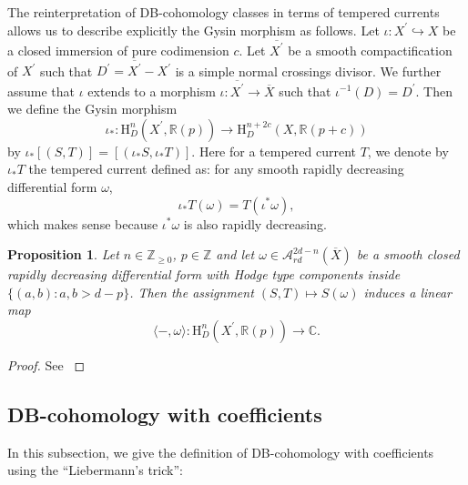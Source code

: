 \documentclass[11pt, a4paper]{amsart}
\theoremstyle{plain}
\newtheorem{proposition}[theorem]{Proposition}
\theoremstyle{definition}
\numberwithin{equation}{section}
\def\CC{\mathbb{C}}
\def\RR{\mathbb{R}}
\def\ZZ{\mathbb{Z}}
\begin{document}
The reinterpretation of DB-cohomology classes in terms of tempered currents allows us to describe explicitly the Gysin morphism as follows. 
Let $\iota \colon X^{\prime} \hookrightarrow X$ be a closed immersion of pure codimension $c$. Let $\overline{X^{\prime}}$ be a smooth compactification of $X^{\prime}$ such that $D^{\prime} = \overline{X^{\prime}} - X^{\prime}$ is a simple normal crossings divisor. We further assume that $\iota$ extends to a morphism $\iota \colon \overline{X^{\prime}} \rightarrow \overline{X}$ such that $\iota^{-1}(D) = D^{\prime}$. Then we define the Gysin morphism 
\begin{equation}
\label{eq: Gysin for DB-cohomology}
    \iota_{*} \colon \mathrm{H}_{D}^{n}(X^{\prime}, \RR(p)) \rightarrow \mathrm{H}_{D}^{n + 2c}(X, \RR(p + c))
\end{equation}
by $\iota_{*}[(S, T)] = [(\iota_{*}S, \iota_{*}T)]$. 
Here for a tempered current $T$, we denote by $\iota_{*}T$ the tempered current defined as: for any smooth rapidly decreasing differential form $\omega$,
\begin{equation}
\label{eq: pushforward of tempered currents}
    \iota_{*}T(\omega) = T(\iota^{*} \omega), 
\end{equation}
which makes sense because $\iota^{*} \omega$ is also rapidly decreasing. 

\begin{proposition}
    Let $n \in \ZZ_{\ge 0}$, $p \in \ZZ$ and let $\omega \in \mathcal{A}_{rd}^{2d - n}(\overline{X})$ be a smooth closed rapidly decreasing  differential form with Hodge type components inside $\{(a, b): a, b > d - p\}$. Then the assignment $(S, T) \mapsto S(\omega)$ induces a linear map 
    \begin{equation*}
        \langle -, \omega \rangle \colon \mathrm{H}_{D}^{n}(X^{\prime}, \RR(p)) \rightarrow \CC. 
    \end{equation*}
\end{proposition}

\begin{proof}
    See \cite[Proposition 2.27]{BCLRJ24}
\end{proof}

\subsection{DB-cohomology with coefficients}
\label{SS: DB-cohomology with coeffients}
In this subsection, we give the definition of DB-cohomology with coefficients using the ``Liebermann’s trick'':
\end{document}
